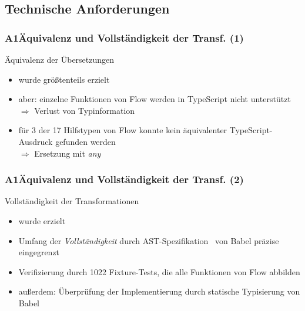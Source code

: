     \subsection{Technische Anforderungen}

      \begin{frame}
        \frametitle{A1\hspace{0.75em}Äquivalenz und Vollständigkeit der Transf. (1)}
        \begin{block}{Äquivalenz der Übersetzungen}
          \begin{itemize}
            \item wurde größtenteils erzielt
            \item aber: einzelne Funktionen von Flow werden in TypeScript nicht unterstützt\\
              \smallskip
              $\Rightarrow$ Verlust von Typinformation
            \item für 3 der 17 Hilfstypen von Flow konnte kein äquivalenter TypeScript-Ausdruck gefunden werden\\
              \smallskip
              $\Rightarrow$ Ersetzung mit \textit{any}
          \end{itemize}
        \end{block}
      \end{frame}

      \begin{frame}
        \frametitle{A1\hspace{0.75em}Äquivalenz und Vollständigkeit der Transf. (2)}
        \begin{block}{Vollständigkeit der Transformationen}
          \begin{itemize}
            \item wurde erzielt
            \item Umfang der \textit{Vollständigkeit} durch AST-Spezifikation~\autocite{BABEL:PARSER_SPEC} von Babel präzise eingegrenzt
            \item Verifizierung durch 1022 Fixture-Tests, die alle Funktionen von Flow abbilden
            \item außerdem: Überprüfung der Implementierung durch statische Typisierung von Babel
          \end{itemize}
        \end{block}
      \end{frame}

